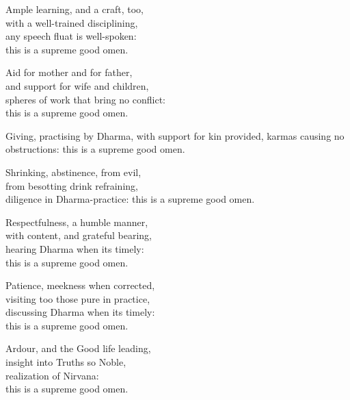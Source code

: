 \begin{MyDescription}{}
Ample learning, and a craft, too,\\
with a well-trained disciplining,\\
any speech ﬂuat is well-spoken:\\
this is a supreme good omen.
\end{MyDescription} 

\begin{MyDescription}{}
Aid for mother and for father,\\
and support for wife and children,\\
spheres of work that bring no conﬂict:\\
this is a supreme good omen.
\end{MyDescription} 

\begin{MyDescription}{}
Giving, practising by Dharma,
with support for kin provided,
karmas causing no obstructions:
this is a supreme good omen.
\end{MyDescription} 

\begin{MyDescription}{}
Shrinking, abstinence, from evil,\\
from besotting drink refraining,\\
diligence in Dharma-practice:
this is a supreme good omen.
\end{MyDescription} 

\begin{MyDescription}{}
Respectfulness, a humble manner,\\
with content, and grateful bearing,\\
hearing Dharma when its timely:\\
this is a supreme good omen.
\end{MyDescription} 

\begin{MyDescription}{}
Patience, meekness when corrected,\\
visiting too those pure in practice,\\
discussing Dharma when its timely:\\
this is a supreme good omen.
\end{MyDescription} 

\begin{MyDescription}{}
Ardour, and the Good life leading,\\
insight into Truths so Noble,\\
realization of Nirvana:\\
this is a supreme good omen.
\end{MyDescription} 

